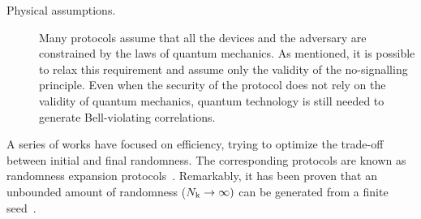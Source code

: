 \documentclass[11pt,a4paper]{article}
\begin{document}
\begin{description}
    \item[Physical assumptions.]    Many protocols assume that all the devices and the adversary are constrained by the laws of quantum mechanics. As mentioned, it is possible to relax this requirement and assume %
    only the validity of the no-signalling principle. %
    Even when the security of the protocol does not rely on the validity of quantum mechanics, quantum technology is still needed to generate Bell-violating correlations.

\end{description}

A series of works have focused on efficiency, trying to optimize the trade-off between initial and final randomness. The corresponding protocols are known as randomness expansion protocols~\cite{PhDColbeck, Pironio, ColbeckKent, vv, coudron_yuen, miller_shi, Chung, miller_shi2, EATQKD}. Remarkably, it has been proven that an unbounded amount of randomness ($N_{\rm k} \to \infty)$ can be generated from a finite seed~\cite{coudron_yuen, Chung}.
\end{document}
